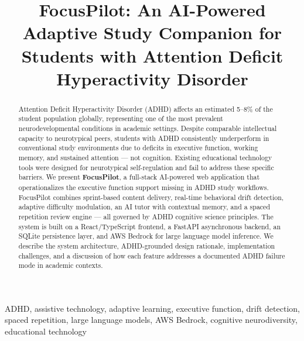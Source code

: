\documentclass[conference]{IEEEtran}
\begin{document}
\title{FocusPilot: An AI-Powered Adaptive Study Companion for Students with Attention Deficit Hyperactivity Disorder}

\author{
}

\maketitle

\begin{abstract}
Attention Deficit Hyperactivity Disorder (ADHD) affects an estimated 5–8\% of the student population globally, representing one of the most prevalent neurodevelopmental conditions in academic settings. Despite comparable intellectual capacity to neurotypical peers, students with ADHD consistently underperform in conventional study environments due to deficits in executive function, working memory, and sustained attention — not cognition. Existing educational technology tools were designed for neurotypical self-regulation and fail to address these specific barriers. We present \textbf{FocusPilot}, a full-stack AI-powered web application that operationalizes the executive function support missing in ADHD study workflows. FocusPilot combines sprint-based content delivery, real-time behavioral drift detection, adaptive difficulty modulation, an AI tutor with contextual memory, and a spaced repetition review engine — all governed by ADHD cognitive science principles. The system is built on a React/TypeScript frontend, a FastAPI asynchronous backend, an SQLite persistence layer, and AWS Bedrock for large language model inference. We describe the system architecture, ADHD-grounded design rationale, implementation challenges, and a discussion of how each feature addresses a documented ADHD failure mode in academic contexts.
\end{abstract}

\begin{IEEEkeywords}
ADHD, assistive technology, adaptive learning, executive function, drift detection, spaced repetition, large language models, AWS Bedrock, cognitive neurodiversity, educational technology
\end{IEEEkeywords}
\end{document}
